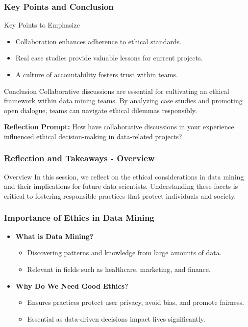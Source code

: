\documentclass[aspectratio=169]{beamer}
\begin{document}
\begin{frame}[fragile]
    \frametitle{Key Points and Conclusion}
    \begin{block}{Key Points to Emphasize}
        \begin{itemize}
            \item Collaboration enhances adherence to ethical standards.
            \item Real case studies provide valuable lessons for current projects.
            \item A culture of accountability fosters trust within teams.
        \end{itemize}
    \end{block}

    \begin{block}{Conclusion}
        Collaborative discussions are essential for cultivating an ethical framework within data mining teams. By analyzing case studies and promoting open dialogue, teams can navigate ethical dilemmas responsibly.
    \end{block}
    
    \textbf{Reflection Prompt:} How have collaborative discussions in your experience influenced ethical decision-making in data-related projects?
\end{frame}

\begin{frame}[fragile]
    \frametitle{Reflection and Takeaways - Overview}
    \begin{block}{Overview}
        In this session, we reflect on the ethical considerations in data mining and their implications for future data scientists. 
        Understanding these facets is critical to fostering responsible practices that protect individuals and society.
    \end{block}
\end{frame}

\begin{frame}[fragile]
    \frametitle{Importance of Ethics in Data Mining}
    \begin{itemize}
        \item \textbf{What is Data Mining?} 
        \begin{itemize}
            \item Discovering patterns and knowledge from large amounts of data.
            \item Relevant in fields such as healthcare, marketing, and finance.
        \end{itemize}
        
        \item \textbf{Why Do We Need Good Ethics?} 
        \begin{itemize}
            \item Ensures practices protect user privacy, avoid bias, and promote fairness.
            \item Essential as data-driven decisions impact lives significantly.
        \end{itemize}
    \end{itemize}
\end{frame}
\end{document}
